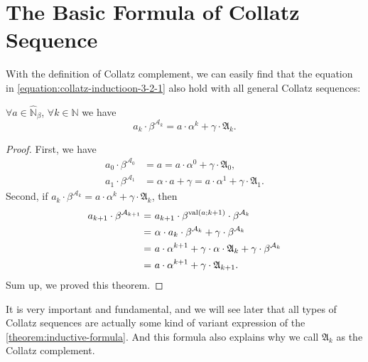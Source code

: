 \section{The Basic Formula of Collatz Sequence}\label{sec:the-basic-formula-of-collatz-sequence}

With the definition of Collatz complement, we can easily find that the equation in \cref{equation:collatz-inductioon-3-2-1} also hold with all general Collatz sequences:
\begin{theorem}\label{theorem:inductive-formula}
$\forall a \in \widehat{\mathbb{N}}_{{\beta}}$, $\forall k \in \mathbb{N}$ we have
\[ a_k \cdot \beta^{\mathcal{A}_k} = a \cdot\alpha^k + \gamma\cdot\mathfrak{A}_{k}. \]
\end{theorem}
\begin{proof}
    First, we have
    \begin{align*}
        a_0 \cdot \beta^{\mathcal{A}_0} &= a = a \cdot \alpha^{0} + \gamma \cdot \mathfrak{A}_0, \\
        a_1 \cdot \beta^{\mathcal{A}_1} &= \alpha \cdot a + \gamma = a \cdot \alpha^{1} + \gamma \cdot \mathfrak{A}_1.
    \end{align*}
    Second, if $a_k \cdot \beta^{\mathcal{A}_k} = a \cdot\alpha^k + \gamma\cdot\mathfrak{A}_{k}$, then
    \begin{align*}
        a_{k+1} \cdot \beta^{\mathcal{A}_{k+1}}
        =&\ a_{k+1} \cdot \beta^{\operatorname{val}(a;k+1)} \cdot \beta^{\mathcal{A}_{k}} \\
        =&\ \alpha \cdot a_k \cdot \beta^{\mathcal{A}_k} + \gamma \cdot \beta^{\mathcal{A}_k} \\
        =&\ a \cdot \alpha^{k+1} + \gamma \cdot \alpha \cdot \mathfrak{A}_{k} + \gamma \cdot \beta^{\mathcal{A}_k} \\
        =&\ a \cdot \alpha^{k+1} + \gamma \cdot \mathfrak{A}_{k+1}.
    \end{align*}
    Sum up, we proved this theorem.
\end{proof}
It is very important and fundamental, and we will see later that all types of Collatz sequences are actually some kind of variant expression of the \cref{theorem:inductive-formula}. And this formula also explains why we call $\mathfrak{A}_k$ as the Collatz complement.

